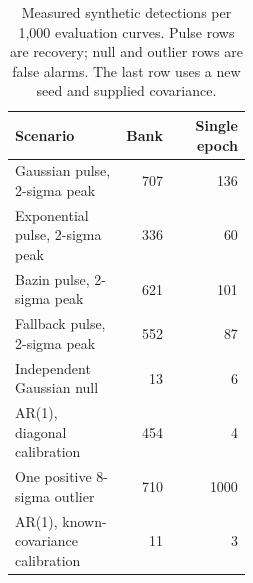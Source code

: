 \begin{table}[ht]
\centering
\caption{Measured synthetic detections per 1,000 evaluation curves. Pulse rows are recovery; null and outlier rows are false alarms. The last row uses a new seed and supplied covariance.}
\label{tab:search-diagnostic}
\begin{tabular}{p{0.47\linewidth}rr}
\toprule
Scenario & Bank & Single epoch \\
\midrule
Gaussian pulse, 2-sigma peak & 707 & 136 \\
Exponential pulse, 2-sigma peak & 336 & 60 \\
Bazin pulse, 2-sigma peak & 621 & 101 \\
Fallback pulse, 2-sigma peak & 552 & 87 \\
Independent Gaussian null & 13 & 6 \\
AR(1), diagonal calibration & 454 & 4 \\
One positive 8-sigma outlier & 710 & 1000 \\
AR(1), known-covariance calibration & 11 & 3 \\
\bottomrule
\end{tabular}
\end{table}
